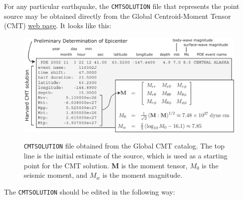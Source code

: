 \newpage
For any particular earthquake, the \texttt{CMTSOLUTION} file that
represents the point source may be obtained directly from the Global Centroid-Moment Tensor (CMT) \href{www.globalcmt.org}{web page}.
It looks like this:

\begin{lyxcode}
{\small }%
\begin{figure}[H]
\noindent \begin{centering}
{\small \includegraphics[width=1\textwidth]{figures/Denali_CMT.pdf} }
\par\end{centering}{\small \par}

\caption{\texttt{CMTSOLUTION} file obtained from the Global CMT catalog. The
top line is the initial estimate of the source, which is used as a
starting point for the CMT solution. \textbf{M} is the moment tensor,
$M_{0}${\small{} }is the seismic moment, and $M_{w}$ is the moment
magnitude.}


\label{fig:CMTSOLUTION-file}
\end{figure}
{\small \par}
\end{lyxcode}
The \texttt{CMTSOLUTION} should be edited in the following way:

